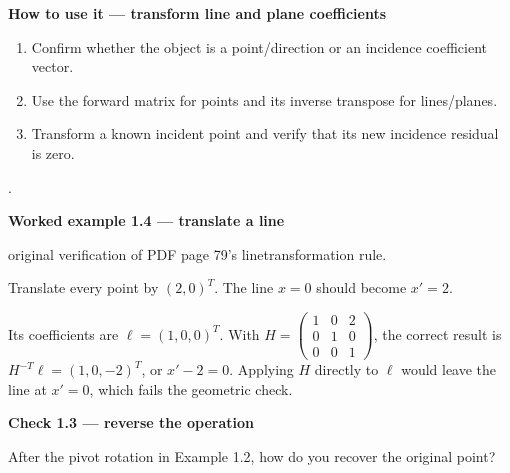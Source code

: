 \documentclass[letterpaper,11pt,english,openany,oneside]{jupyterBook}
\begin{document}
\begin{TextbookBox}
\textbf{How to use it — transform line and plane coefficients}\par\smallskip
\begin{enumerate}
%
\item {}
\sphinxAtStartPar
Confirm whether the object is a point/direction or an incidence coefficient vector.

\item {}
\sphinxAtStartPar
Use the forward matrix for points and its inverse transpose for lines/planes.

\item {}
\sphinxAtStartPar
Transform a known incident point and verify that its new incidence residual is zero.

\end{enumerate}

\sphinxAtStartPar
{} {\hyperref[\detokenize{lectures/lecture01/transformations:ex-lec01-line-transform}]{}}.

\end{TextbookBox}
\label{\detokenize{lectures/lecture01/transformations:ex-lec01-line-transform}}
\begin{TextbookBox}
\textbf{Worked example 1.4 — translate a line}\par\smallskip

\sphinxAtStartPar
{} original verification of PDF page 79’s line\sphinxhyphen{}transformation rule.

\sphinxAtStartPar
Translate every point by \((2,0)^T\). The line \(x=0\) should become \(x'=2\).

\sphinxAtStartPar
Its coefficients are \(\ell=(1,0,0)^T\). With \(H=\begin{pmatrix}1&0&2\\0&1&0\\0&0&1\end{pmatrix}\), the correct result is \(H^{-T}\ell=(1,0,-2)^T\), or \(x'-2=0\). Applying \(H\) directly to \(\ell\) would leave the line at \(x'=0\), which fails the geometric check.

\end{TextbookBox}

\begin{TextbookBox}
\textbf{Check 1.3 — reverse the operation}\par\smallskip

\sphinxAtStartPar
After the pivot rotation in Example 1.2, how do you recover the original point?

\end{TextbookBox}
\end{document}
